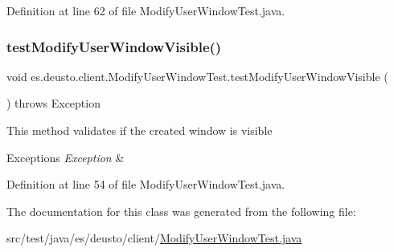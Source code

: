 Definition at line 62 of file Modify\+User\+Window\+Test.\+java.

\mbox{\label{classes_1_1deusto_1_1client_1_1_modify_user_window_test_aaa2f9f6ce4607df013e00284b44f1973}} 
\subsubsection{\texorpdfstring{test\+Modify\+User\+Window\+Visible()}{testModifyUserWindowVisible()}}
{\footnotesize\ttfamily void es.\+deusto.\+client.\+Modify\+User\+Window\+Test.\+test\+Modify\+User\+Window\+Visible (\begin{DoxyParamCaption}{ }\end{DoxyParamCaption}) throws Exception}

This method validates if the created window is visible 
\begin{DoxyExceptions}{Exceptions}
{\em Exception} & \\
\hline
\end{DoxyExceptions}


Definition at line 54 of file Modify\+User\+Window\+Test.\+java.



The documentation for this class was generated from the following file\+:\begin{DoxyCompactItemize}
\item 
src/test/java/es/deusto/client/\hyperlink{_modify_user_window_test_8java}{Modify\+User\+Window\+Test.\+java}\end{DoxyCompactItemize}
